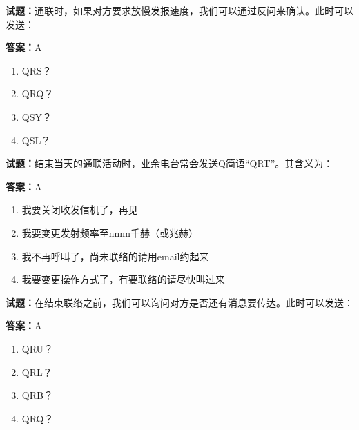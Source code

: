 \documentclass{ctexbook}
\begin{document}




\vspace{1em}

\textbf{试题：}通联时，如果对方要求放慢发报速度，我们可以通过反问来确认。此时可以发送： 

\textbf{答案：}A 

\begin{enumerate}[leftmargin=3em]
  \item QRS？ 

  \item QRQ？ 

  \item QSY？ 

  \item QSL？ 

\end{enumerate}





\vspace{1em}

\textbf{试题：}结束当天的通联活动时，业余电台常会发送Q简语“QRT”。其含义为： 

\textbf{答案：}A 

\begin{enumerate}[leftmargin=3em]
  \item 我要关闭收发信机了，再见 

  \item 我要变更发射频率至nnnn千赫（或兆赫） 

  \item 我不再呼叫了，尚未联络的请用email约起来 

  \item 我要变更操作方式了，有要联络的请尽快叫过来 

\end{enumerate}





\vspace{1em}

\textbf{试题：}在结束联络之前，我们可以询问对方是否还有消息要传达。此时可以发送： 

\textbf{答案：}A 

\begin{enumerate}[leftmargin=3em]
  \item QRU？ 

  \item QRL？ 

  \item QRB？ 

  \item QRQ？ 

\end{enumerate}
\end{document}
